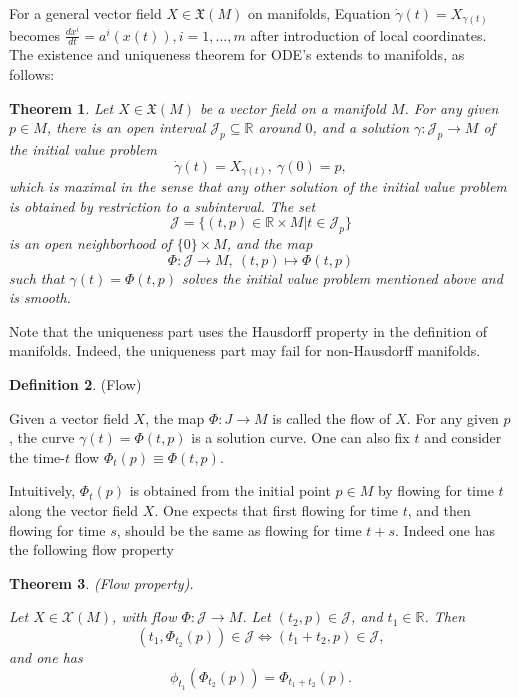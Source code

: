 \documentclass{article}
\newtheorem{theorem}{Theorem}[section]
\theoremstyle{definition}
\newtheorem{defn}[theorem]{Definition}
\newenvironment{definition}
  {\vspace{8pt}\begin{mdframed}[backgroundcolor=blueish]\begin{defn}}
  {\end{defn}\end{mdframed}\vspace{4pt}}
\begin{document}
For a general vector field $X \in \mathfrak X(M)$ on manifolds, Equation $\dot{\gamma}(t) = X_{\gamma(t)}$ becomes $\frac{dx^i}{dt} = a^i (x(t)), i = 1,\dots,m$ after introduction of local coordinates. The existence and uniqueness theorem for ODE’s extends to manifolds, as follows:

\begin{theorem}

Let $X \in \mathfrak X(M)$ be a vector field on a manifold $M$. For any given $p \in M$, there is an open interval $\mathscr J_p \subseteq \mathbb R$ around $0$, and a solution $\gamma : \mathscr J_p \rightarrow M$ of the initial value problem 
\[
    \dot{\gamma}(t) = X_{\gamma(t)} ,\  \gamma(0) = p,
\]
which is maximal in the sense that any other solution of the initial value problem is obtained by restriction to a subinterval. The set 
\[
    \mathscr J = \{(t, p) \in\mathbb R \times M | t \in \mathscr J_p\}
\]
is an open neighborhood of $\{0\} \times M$, and the map 
\[
    \Phi : \mathscr J \rightarrow M,  \ (t, p) \mapsto  \Phi(t, p)
\]
such that $\gamma(t) = \Phi(t, p)$ solves the initial value problem mentioned above and is smooth.
\end{theorem}

Note that the uniqueness part uses the Hausdorff property in the definition of manifolds. Indeed, the uniqueness part may fail for non-Hausdorff manifolds.

\begin{definition} (Flow)

Given a vector field $X$, the map $\Phi : J \rightarrow M$ is called the flow of $X$. For any given $p$, the curve $\gamma(t) = \Phi(t, p)$ is a solution curve.  One can also fix $t$ and consider the time-$t$ flow $\Phi_t(p) \equiv \Phi(t, p).$
\end{definition}


Intuitively, $\Phi_t(p)$ is obtained from the initial point $p \in M$ by flowing for time $t$ along the vector field $X$. One expects that first flowing for time $t$, and then flowing for time $s$, should be the same as flowing for time $t +s$. Indeed one has the following
flow property

\begin{theorem}  (Flow property).

Let $X \in \mathscr X(M)$, with flow $\Phi : \mathscr J \rightarrow M$. Let $(t_2, p) \in \mathscr J$, and $t_1 \in \mathbb R$. Then 
\[ 
    (t_1,\Phi_{t_2} (p)) \in \mathscr J \iff (t_1 +t_2, p) \in \mathscr J,
\]
and one has 
\[
    \phi_{t_1} (\Phi_{t_2} (p)) = \Phi_{t_1+t_2} (p).
\]

\end{theorem}
\end{document}
